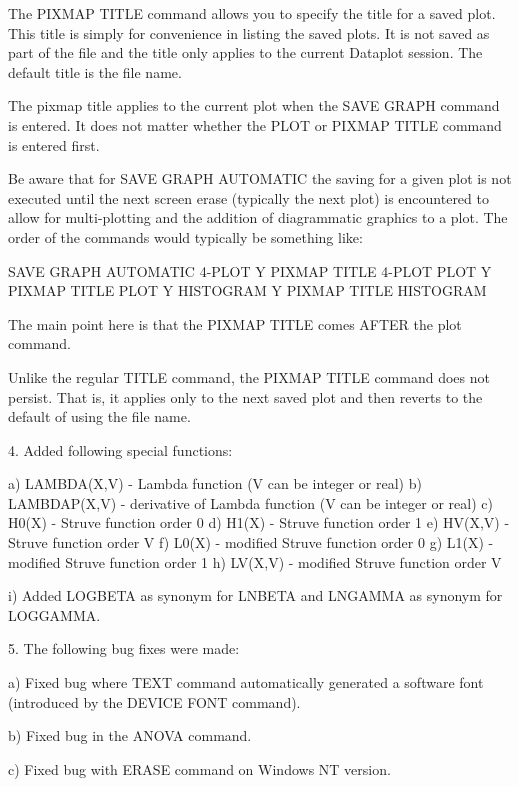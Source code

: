 {    The PIXMAP TITLE command allows you to specify the title for
    a saved plot.  This title is simply for convenience in listing
    the saved plots.  It is not saved as part of the file and the
    title only applies to the current Dataplot session.  The default
    title is the file name.

    The pixmap title applies to the current plot when the SAVE GRAPH
    command is entered.  It does not matter whether the PLOT or
    PIXMAP TITLE command is entered first.

    Be aware that for SAVE GRAPH AUTOMATIC the saving for a given
    plot is not executed until the next screen erase (typically the
    next plot) is encountered to allow for multi-plotting and the
    addition of diagrammatic graphics to a plot.  The order of
    the commands would typically be something like:

       SAVE GRAPH AUTOMATIC
       4-PLOT Y
       PIXMAP TITLE 4-PLOT
       PLOT Y
       PIXMAP TITLE PLOT Y
       HISTOGRAM Y
       PIXMAP TITLE HISTOGRAM

    The main point here is that the PIXMAP TITLE comes AFTER the
    plot command.

    Unlike the regular TITLE command, the PIXMAP TITLE command does
    not persist.  That is, it applies only to the next saved plot and
    then reverts to the default of using the file name.

 4. Added following special functions:

    a) LAMBDA(X,V)  - Lambda function (V can be integer or real)
    b) LAMBDAP(X,V) - derivative of Lambda function (V can be integer
                      or real)
    c) H0(X)        - Struve function order 0
    d) H1(X)        - Struve function order 1
    e) HV(X,V)      - Struve function order V
    f) L0(X)        - modified Struve function order 0
    g) L1(X)        - modified Struve function order 1
    h) LV(X,V)      - modified Struve function order V

    i) Added LOGBETA as synonym for LNBETA and LNGAMMA as synonym for
       LOGGAMMA.

 5. The following bug fixes were made:

    a) Fixed bug where TEXT command automatically generated a software
       font (introduced by the DEVICE FONT command).

    b) Fixed bug in the ANOVA command.

    c) Fixed bug with ERASE command on Windows NT version.

}
